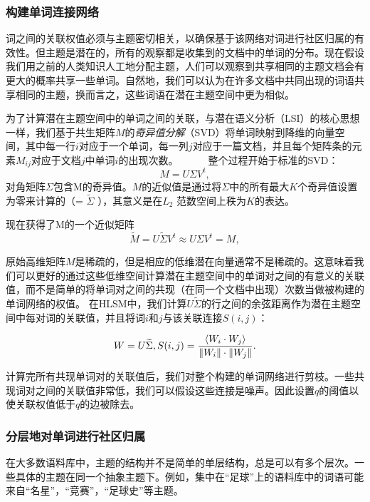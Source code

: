 \subsubsection{构建单词连接网络}
词之间的关联权值必须与主题密切相关，以确保基于该网络对词进行社区归属的有效性。但主题是潜在的，所有的观察都是收集到的文档中的单词的分布。现在假设我们用之前的人类知识人工地分配主题，人们可以观察到共享相同的主题文档会有更大的概率共享一些单词。自然地，我们可以认为在许多文档中共同出现的词语共享相同的主题，换而言之，这些词语在潜在主题空间中更为相似。

为了计算潜在主题空间中的单词之间的关联，与潜在语义分析（LSI）的核心思想一样，我们基于共生矩阵$ M $的\emph{奇异值分解}（SVD）将单词映射到降维的向量空间，其中每一行$ i $对应于一个单词，每一列$ j $对应于一篇文档，并且每个矩阵条的元素$ M_{ij} $对应于文档$ j $中单词$ i $的出现次数。
  
  
整个过程开始于标准的SVD：
    \begin{equation}
  M = U \Sigma V^t,
   \end{equation}      
对角矩阵$ \Sigma $包含M的奇异值。$ M $的近似值是通过将$ \Sigma $中的所有最大$ K $个奇异值设置为零来计算的（= $ \widetilde{\Sigma} $ ），其意义是在$ L_2 $ 范数空间上秩为$K$的表达。

现在获得了M的一个近似矩阵
    \begin{equation}
    \widetilde{M} = U \widetilde{\Sigma} V^t  \approx  U \Sigma V^t = M,
   \end{equation} 
   
原始高维矩阵$ M $是稀疏的，但是相应的低维潜在向量通常不是稀疏的。这意味着我们可以更好的通过这些低维空间计算潜在主题空间中的单词对之间的有意义的关联值，而不是简单的将单词对之间的共现（在同一个文档中出现）次数当做被构建的单词网络的权值。 在HLSM中，我们计算$ U\widetilde{\Sigma}$的行之间的余弦距离作为潜在主题空间中每对词的关联值，并且将词$ i $和$ j $与该关联连接$ S(i,j)$：
      
   \begin{equation}	
    W = U\widetilde{\Sigma},\\
   S(i,j) = \frac{\langle W_i \cdot W_j \rangle }{ \| W_i \| \cdot \| W_j \|}.
   \end{equation}
   
计算完所有共现单词对的关联值后，我们对整个构建的单词网络进行剪枝。一些共现词对之间的关联值非常低，我们可以假设这些连接是噪声。因此设置$ q $的阈值以使关联权值低于$ q $的边被除去。

\subsubsection{分层地对单词进行社区归属}
在大多数语料库中，主题的结构并不是简单的单层结构，总是可以有多个层次。一些具体的主题在同一个抽象主题下。例如，集中在“足球”上的语料库中的词语可能来自“名星”，“竞赛”，“足球史”等主题。

